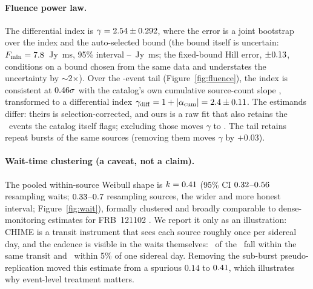 \documentclass[twocolumn]{aastex631}
\begin{document}
\paragraph{Fluence power law.} The differential index is
$\gamma=2.54\pm0.292$, where the error is a joint bootstrap over
the index and the auto-selected bound (the bound itself is uncertain:
$F_\mathrm{min}=7.8$~Jy~ms, 95\% interval
\energyFminCIlo--\energyFminCIhi~Jy~ms; the fixed-bound Hill error,
$\pm0.13$, conditions on a bound chosen from the same data and understates
the uncertainty by $\sim$2$\times$). Over the \energyNtail-event tail
(Figure~\ref{fig:fluence}), the index is consistent at $0.46\sigma$ with
the catalog's own cumulative source-count slope \citep{chimecat1}, transformed to a
differential index $\gamma_\mathrm{diff}=1+|\alpha_\mathrm{cum}|=2.4\pm0.11$.
The estimands differ: theirs is selection-corrected, and ours is a raw fit that
also retains the \nExcludedFlag\ events the catalog itself flags; excluding those moves
$\gamma$ to \energyGammaNoExcl. The tail retains repeat bursts of the same sources
(removing them moves $\gamma$ by $+0.03$).

\paragraph{Wait-time clustering (a caveat, not a claim).} The pooled within-source
Weibull shape is $k=0.41$ (95\% CI $0.32$--$0.56$ resampling waits;
$0.33$--$0.7$ resampling sources, the wider and more honest
interval; Figure~\ref{fig:wait}), formally clustered and broadly comparable to
dense-monitoring estimates for FRB~121102 \citep{oppermann2018}. We report it only as an
illustration: CHIME is a transit instrument that sees each source roughly once per
sidereal day, and the cadence is visible in the waits themselves:
\nWaitsSameTransit\ of the \weibullNwaits\ fall within the same transit and
\nWaitsSidereal\ within 5\% of one sidereal day. Removing the sub-burst
pseudo-replication moved this estimate from a spurious $0.14$ to $0.41$, which
illustrates why event-level treatment matters.
\end{document}
